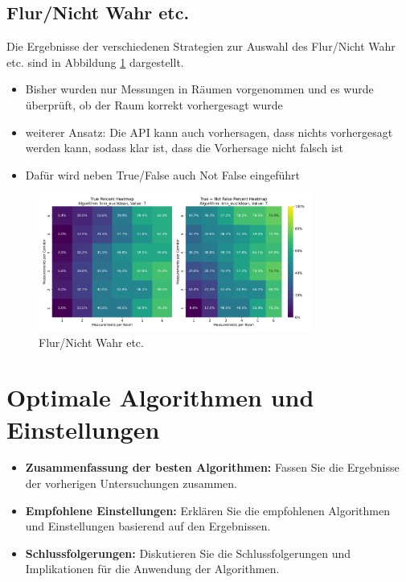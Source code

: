\subsection{Flur/Nicht Wahr etc.}

Die Ergebnisse der verschiedenen Strategien zur Auswahl des Flur/Nicht Wahr etc. sind in Abbildung \ref{fig:8_test_corrdior_01} dargestellt.

\begin{itemize}
    \item Bisher wurden nur Messungen in Räumen vorgenommen und es wurde überprüft, ob der Raum korrekt vorhergesagt wurde
    \item weiterer Ansatz: Die API kann auch vorhersagen, dass nichts vorhergesagt werden kann, sodass klar ist, dass die Vorhersage nicht falsch ist
    \item Dafür wird neben True/False auch Not False eingeführt
\end{itemize}    

\begin{figure}[H]
    \centering
    \includegraphics[width=0.8\textwidth]{images/8_test_corrdior_01.png}
    \caption{Flur/Nicht Wahr etc.}
    \label{fig:8_test_corrdior_01}
\end{figure}

\section{Optimale Algorithmen und Einstellungen}
\begin{itemize}
    \item \textbf{Zusammenfassung der besten Algorithmen:} Fassen Sie die Ergebnisse der vorherigen Untersuchungen zusammen.
    \item \textbf{Empfohlene Einstellungen:} Erklären Sie die empfohlenen Algorithmen und Einstellungen basierend auf den Ergebnissen.
    \item \textbf{Schlussfolgerungen:} Diskutieren Sie die Schlussfolgerungen und Implikationen für die Anwendung der Algorithmen.
\end{itemize}
